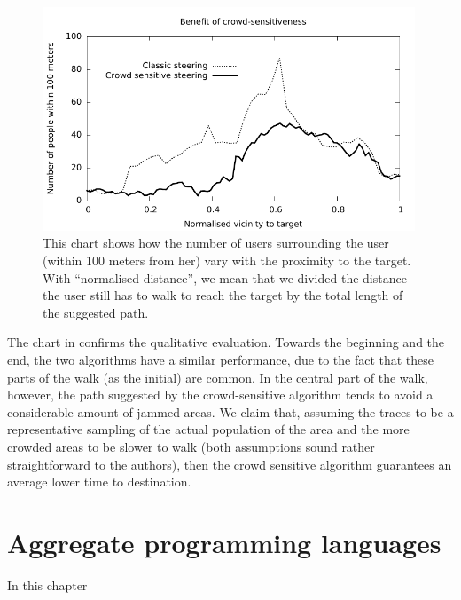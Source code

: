 \documentclass[12pt,a4paper,twoside,openright]{book}
\begin{document}
\begin{figure}
 \includegraphics[width=0.99\textwidth]{img/ahpc-chart}
 \caption[Urban crowd steering effectiveness]{This chart shows how the number of users surrounding the user (within 100 meters from her) vary with the proximity to the target.
%
 With ``normalised distance'', we mean that we divided the distance the user still has to walk to reach the target by the total length of the suggested path.
 }
 \label{img:ahpc-chart}
\end{figure}

The chart in  confirms the qualitative evaluation.
%
Towards the beginning and the end, the two algorithms have a similar performance, due to the fact that these parts of the walk (as the initial) are common.
%
In the central part of the walk, however, the path suggested by the crowd-sensitive algorithm tends to avoid a considerable amount of jammed areas.
%
We claim that, assuming the traces to be a representative sampling of the actual population of the area and the more crowded areas to be slower to walk (both assumptions sound rather straightforward to the authors), then the crowd sensitive algorithm guarantees an average lower time to destination.

\chapter{Aggregate programming languages}
In this chapter
\end{document}
